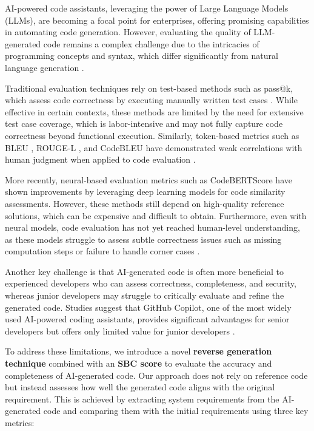\documentclass{article}
\begin{document}
AI-powered code assistants, leveraging the power of Large Language Models (LLMs), are becoming a focal point for enterprises, offering promising capabilities in automating code generation. However, evaluating the quality of LLM-generated code remains a complex challenge due to the intricacies of programming concepts and syntax, which differ significantly from natural language generation \cite{evtikhiev2023evaluating, hindle2016naturalness}.  

Traditional evaluation techniques rely on test-based methods such as pass@k, which assess code correctness by executing manually written test cases \cite{kulal2019spoc, chen2021evaluating}. While effective in certain contexts, these methods are limited by the need for extensive test case coverage, which is labor-intensive and may not fully capture code correctness beyond functional execution. Similarly, token-based metrics such as BLEU \cite{papineni2002bleu}, ROUGE-L \cite{lin2004rouge}, and CodeBLEU \cite{ren2020codebleu} have demonstrated weak correlations with human judgment when applied to code evaluation \cite{evtikhiev2023evaluating}.  

More recently, neural-based evaluation metrics such as CodeBERTScore \cite{zhou2023codebertscore} have shown improvements by leveraging deep learning models for code similarity assessments. However, these methods still depend on high-quality reference solutions, which can be expensive and difficult to obtain. Furthermore, even with neural models, code evaluation has not yet reached human-level understanding, as these models struggle to assess subtle correctness issues such as missing computation steps or failure to handle corner cases \cite{vaithilingam2022expectation, barke2022grounded}.  

Another key challenge is that AI-generated code is often more beneficial to experienced developers who can assess correctness, completeness, and security, whereas junior developers may struggle to critically evaluate and refine the generated code. Studies suggest that GitHub Copilot, one of the most widely used AI-powered coding assistants, provides significant advantages for senior developers but offers only limited value for junior developers \cite{arghavan2023github, vaithilingam2022expectation}.  

To address these limitations, we introduce a novel \textbf{reverse generation technique} combined with an \textbf{SBC score} to evaluate the accuracy and completeness of AI-generated code. Our approach does not rely on reference code but instead assesses how well the generated code aligns with the original requirement. This is achieved by extracting system requirements from the AI-generated code and comparing them with the initial requirements using three key metrics:  
\end{document}
